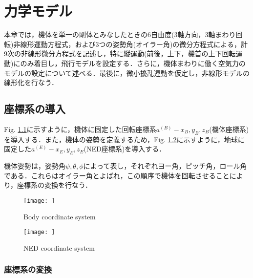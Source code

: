 
\chapter{力学モデル}
\label{model}

本章では，機体を単一の剛体とみなしたときの6自由度(3軸方向，3軸まわり回転)非線形運動方程式，および3つの姿勢角(オイラー角)の微分方程式による，計9次の非線形微分方程式を記述し，特に縦運動(前後，上下，機首の上下回転運動)にのみ着目し，飛行モデルを設定する．さらに，機体まわりに働く空気力のモデルの設定について述べる．最後に，微小擾乱運動を仮定し，非線形モデルの線形化を行なう．

\section{座標系の導入}
\label{sec:axis}

Fig. \ref{fig:body_axis}に示すように，機体に固定した回転座標系$a^{(B)}-x_B,y_B,z_B$(機体座標系)を導入する．また，機体の姿勢を定義するため，Fig. \ref{fig:ned_axis}に示すように，地球に固定した$a^{(E)}-x_E,y_E,z_E$(NED座標系)を導入する．

機体姿勢は，姿勢角$\psi,\theta,\phi$によって表し，それぞれヨー角，ピッチ角，ロール角である．これらはオイラー角とよばれ，この順序で機体を回転させることにより，座標系の変換を行なう．

\begin{figure}[H]
\centering
\texttt{[image: ]}
\caption{Body coordinate system}
\label{fig:body_axis}
\end{figure}

\begin{figure}[H]
\centering
\texttt{[image: ]}
\caption{NED coordinate system}
\label{fig:ned_axis}
\end{figure}


\subsection{座標系の変換}

